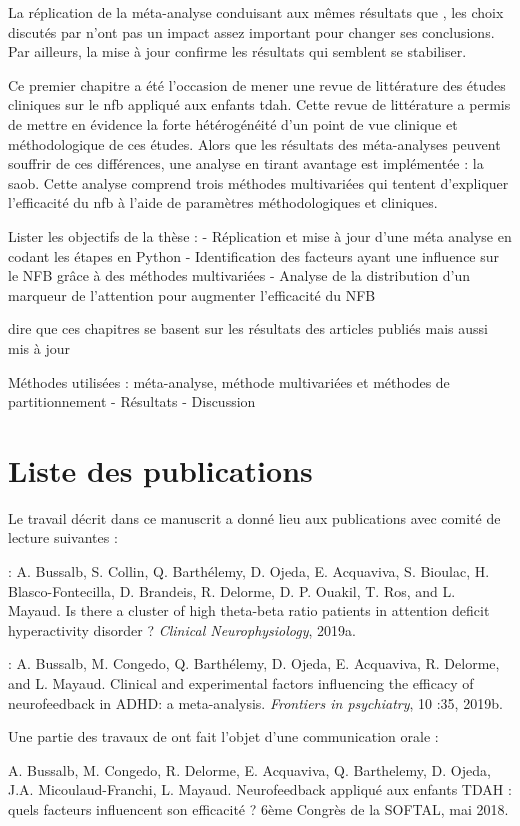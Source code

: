La réplication de la méta-analyse conduisant aux mêmes résultats que \citet{Cortese2016}, les choix discutés par \citet{Micoulaud2016} n'ont pas un impact assez
important pour changer ses conclusions. Par ailleurs, la mise à jour confirme les résultats qui semblent se stabiliser.

Ce premier chapitre a été l'occasion de mener une revue de littérature des études cliniques sur le \gls{nfb} appliqué aux enfants \gls{tdah}. 
Cette revue de littérature a permis de mettre en évidence la forte hétérogénéité d'un point de vue clinique et méthodologique de ces études.
Alors que les résultats des méta-analyses peuvent souffrir de ces différences, une analyse en tirant avantage est implémentée : la \gls{saob}.
Cette analyse comprend trois méthodes multivariées qui tentent d'expliquer l'efficacité du \gls{nfb} à l'aide de paramètres méthodologiques et 
cliniques. 



Lister les objectifs de la thèse :
- Réplication et mise à jour d’une méta analyse en codant les étapes en Python
- Identification des facteurs ayant une influence sur le NFB grâce à des méthodes multivariées
- Analyse de la distribution d’un marqueur de l’attention pour augmenter l’efficacité du NFB

dire que ces chapitres se basent sur les résultats des articles publiés mais aussi mis à jour

Méthodes utilisées : méta-analyse, méthode multivariées et méthodes de partitionnement
- Résultats
- Discussion

\section{Liste des publications}

Le travail décrit dans ce manuscrit a donné lieu aux publications avec comité de lecture suivantes :

\begin{description}
\item \citet{Bussalb2019tbr} : A. Bussalb, S. Collin, Q. Barthélemy, D. Ojeda, E. Acquaviva, S. Bioulac, H. Blasco-Fontecilla,
D. Brandeis, R. Delorme, D. P. Ouakil, T. Ros, and L. Mayaud. Is there a cluster of high
theta-beta ratio patients in attention deficit hyperactivity disorder ? \textit{Clinical Neurophysiology}, 2019a.
\item \citet{Bussalb2019clinical} : A. Bussalb, M. Congedo, Q. Barthélemy, D. Ojeda, E. Acquaviva, R. Delorme,
and L. Mayaud. Clinical and experimental factors influencing the efficacy of
neurofeedback in ADHD: a meta-analysis. \textit{Frontiers in psychiatry}, 10 :35, 2019b.
\end{description}

Une partie des travaux de \citet{Bussalb2019clinical} ont fait l'objet d'une communication orale :

\noindent A. Bussalb, M. Congedo, R. Delorme, E. Acquaviva, Q. Barthelemy, D. Ojeda, J.A. Micoulaud-Franchi, L. Mayaud. Neurofeedback 
appliqué aux enfants TDAH : quels facteurs influencent son efficacité ? 6ème Congrès de la SOFTAL, mai 2018. 
